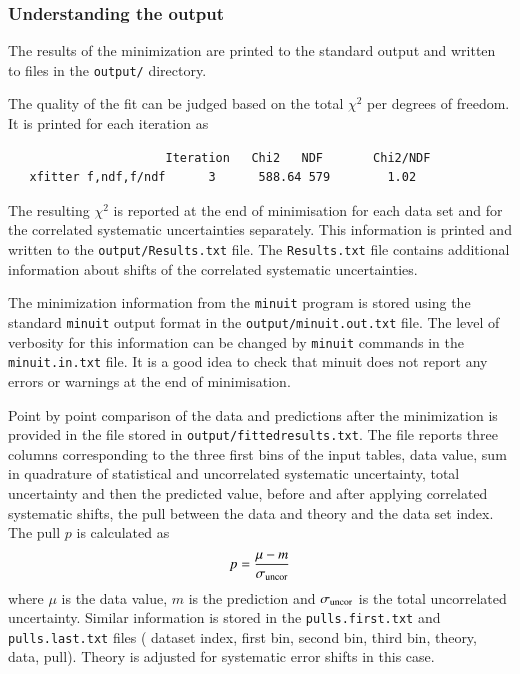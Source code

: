 \subsubsection{Understanding the output}
  The results of the minimization are printed to the standard output and written
  to files in the {\tt output/} directory. 

  The quality of the fit can be judged based on the total $\chi^2$ per degrees of freedom.
  It is printed for each iteration as 
\begin{verbatim}
                      Iteration   Chi2   NDF       Chi2/NDF
   xfitter f,ndf,f/ndf      3      588.64 579        1.02
\end{verbatim}
  The resulting $\chi^2$ is reported at the end of minimisation for each data set and for the correlated 
  systematic uncertainties separately. This information is printed and written
  to the {\tt output/Results.txt} file. The {\tt Results.txt} file contains additional 
  information about shifts of the correlated systematic uncertainties.

  The minimization information from the {\tt minuit} program is stored using the standard {\tt minuit} output format in the {\tt output/minuit.out.txt}
  file. The level of verbosity for this information can be changed by {\tt minuit} commands
  in the {\tt minuit.in.txt} file. 
  It is a good idea to check that minuit does not report any errors
  or warnings at the end of minimisation.
  
  Point by point comparison of the data and predictions after the minimization 
  is provided in the file stored in {\tt output/fittedresults.txt}. The file reports three columns
  corresponding to the three first bins of the input tables, data value, sum in 
  quadrature of statistical and uncorrelated systematic uncertainty, total
  uncertainty and then the predicted value, before and after applying correlated systematic shifts,
  the pull between the  data and theory and 
  the data set index. The pull $p$ is calculated as 
  \begin{equation}
      p = \frac{ \mu - m} {\sigma_{\rm uncor}}
  \end{equation}
  where $\mu$ is the data value, $m$ is the prediction and $\sigma_{\rm uncor}$ is the total
  uncorrelated uncertainty.
  Similar information is stored in the {\tt pulls.first.txt} and {\tt pulls.last.txt} files
  ( dataset index, first bin, second bin, third bin, theory, data, pull).
  Theory is  adjusted for systematic error shifts in this case.

